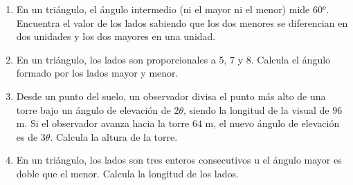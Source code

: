 \begin{enumerate}
\item	 En un triángulo, el ángulo intermedio (ni el mayor ni el menor) mide 60$^o$. Encuentra el valor de los lados sabiendo que los dos menores se diferencian en dos unidades y los dos mayores en una unidad.

\vspace{-6mm}
\begin{flushright}
\begin{footnotesize} \textcolor{gris}{}	\end{footnotesize}
\end{flushright}

\item	 En un triángulo, los lados son proporcionales a 5, 7 y 8. Calcula el ángulo formado por los lados mayor y menor.

\vspace{-6mm}
\begin{flushright}
\begin{footnotesize} \textcolor{gris}{}	\end{footnotesize}
\end{flushright}

\item	Desde un punto del suelo, un observador divisa el punto más alto de una torre bajo un ángulo de elevación de $2\theta$, siendo la longitud de la visual de $96$ m. Si el observador avanza hacia la torre $64$ m, el nuevo ángulo de elevación es de $3\theta$. Calcula la altura de la torre.

\vspace{-6mm}
\begin{flushright}
\begin{footnotesize} \textcolor{gris}{}	\end{footnotesize}
\end{flushright}

\item	 En un triángulo, los lados son tres enteros consecutivos u el ángulo mayor es doble que el menor. Calcula la longitud de los lados.

\vspace{-6mm}
\begin{flushright}
\begin{footnotesize} \textcolor{gris}{}	\end{footnotesize}
\end{flushright}



\end{enumerate}
